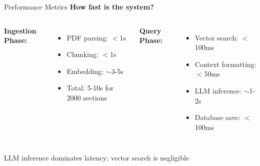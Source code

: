 \documentclass[11pt,aspectratio=16:9]{beamer}
\begin{document}
\begin{frame}{Performance Metrics}
    \textbf{How fast is the system?}
    
    \vspace{0.5cm}
    
    \begin{columns}
        \textbf{Ingestion Phase:}
        \begin{itemize}
            \item PDF parsing: $<$1s
            \item Chunking: $<$1s
            \item Embedding: $\sim$3-5s
            \item Total: 5-10s for 2000 sections
        \end{itemize}
        
        \textbf{Query Phase:}
        \begin{itemize}
            \item Vector search: $<$100ms
            \item Context formatting: $<$50ms
            \item LLM inference: $\sim$1-2s
            \item Database save: $<$100ms
        \end{itemize}
    \end{columns}
    
    \vspace{0.8cm}
    
    \begin{center}
    \end{center}
    
    \vspace{0.5cm}
    {\small LLM inference dominates latency; vector search is negligible}
\end{frame}
\end{document}
